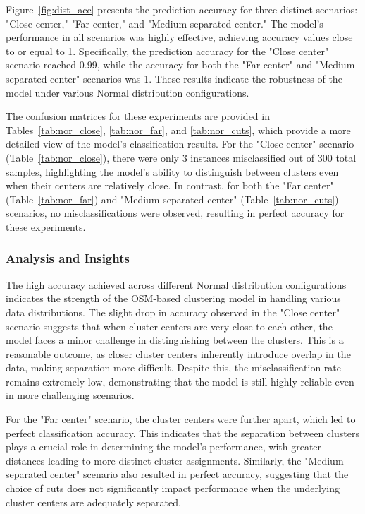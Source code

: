\documentclass{article}
\begin{document}
Figure~\ref{fig:dist_acc} presents the prediction accuracy for three distinct scenarios: "Close center," "Far center," and "Medium separated center." 
The model's performance in all scenarios was highly effective, achieving accuracy values close to or equal to 1. Specifically, the prediction accuracy for the "Close center" scenario reached 0.99, while the accuracy for both the "Far center" and "Medium separated center" scenarios was 1. 
These results indicate the robustness of the model under various Normal distribution configurations.

The confusion matrices for these experiments are provided in Tables~\ref{tab:nor_close}, \ref{tab:nor_far}, and \ref{tab:nor_cuts}, which provide a more detailed view of the model's classification results. 
For the "Close center" scenario (Table~\ref{tab:nor_close}), there were only 3 instances misclassified out of 300 total samples, highlighting the model's ability to distinguish between clusters even when their centers are relatively close. 
In contrast, for both the "Far center" (Table~\ref{tab:nor_far}) and "Medium separated center" (Table~\ref{tab:nor_cuts}) scenarios, no misclassifications were observed, resulting in perfect accuracy for these experiments.

\subsubsection*{Analysis and Insights}

The high accuracy achieved across different Normal distribution configurations indicates the strength of the OSM-based clustering model in handling various data distributions. 
The slight drop in accuracy observed in the "Close center" scenario suggests that when cluster centers are very close to each other, the model faces a minor challenge in distinguishing between the clusters. 
This is a reasonable outcome, as closer cluster centers inherently introduce overlap in the data, making separation more difficult. 
Despite this, the misclassification rate remains extremely low, demonstrating that the model is still highly reliable even in more challenging scenarios.

For the "Far center" scenario, the cluster centers were further apart, which led to perfect classification accuracy. 
This indicates that the separation between clusters plays a crucial role in determining the model's performance, with greater distances leading to more distinct cluster assignments. 
Similarly, the "Medium separated center" scenario also resulted in perfect accuracy, suggesting that the choice of cuts does not significantly impact performance when the underlying cluster centers are adequately separated.
\end{document}
